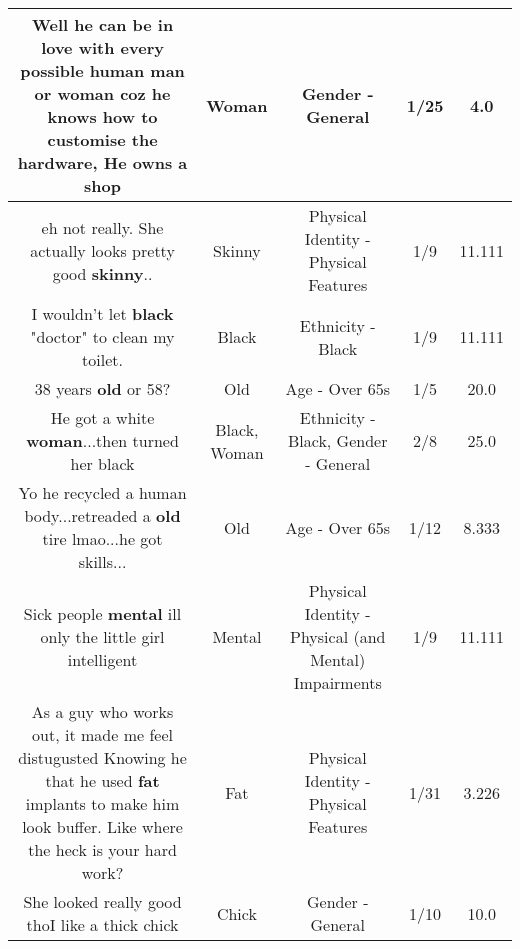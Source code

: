 \documentclass[11pt]{article}
\newlength\mylength
\begin{document}
\begin{center}
\begin{longtable}{|C{.65\mylength}|C{.30\mylength}|C{.12\mylength}|C{.12\mylength}|C{.12\mylength}|}
  \small Well he can be in love with every possible human man or \textbf{woman} coz he knows how to customise the hardware, He owns a shop\normalsize   & Woman & Gender - General & 1/25 & 4.0 \\  \hline
  \small eh not really. She actually looks pretty good \textbf{skinny}..\normalsize   & Skinny & Physical Identity - Physical Features & 1/9 & 11.111 \\  \hline
  \small I wouldn't let \textbf{black} "doctor" to clean my toilet.\normalsize   & Black & Ethnicity - Black & 1/9 & 11.111 \\  \hline
  \small 38 years \textbf{old} or 58?\normalsize   & Old & Age - Over 65s & 1/5 & 20.0 \\  \hline
  \small He got a white \textbf{woman}...then turned her black\normalsize   & Black, Woman & Ethnicity - Black, Gender - General & 2/8 & 25.0 \\  \hline
  \small Yo he recycled a human body...retreaded a \textbf{old} tire lmao...he got skills...\normalsize   & Old & Age - Over 65s & 1/12 & 8.333 \\  \hline
  \small Sick people \textbf{mental} ill only the little girl intelligent\normalsize   & Mental & Physical Identity - Physical (and Mental) Impairments & 1/9 & 11.111 \\  \hline
  \small As a guy who works out,  it made me feel distugusted Knowing he that he used \textbf{fat} implants to make him look buffer.  Like where the heck is your hard work?\normalsize   & Fat & Physical Identity - Physical Features & 1/31 & 3.226 \\  \hline
  \small She looked really good thoI like a thick chick\normalsize   & Chick & Gender - General & 1/10 & 10.0 \\  \hline

\end{longtable}
\end{center}
\end{document}
